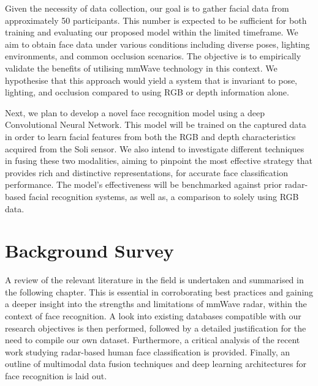 \documentclass{interim}
\begin{document}
Given the necessity of data collection, our goal is to gather facial data from approximately 50 participants. This number is expected to be sufficient for both training and evaluating our proposed model within the limited timeframe. We aim to obtain face data under various conditions including diverse poses, lighting environments, and common occlusion scenarios. The objective is to empirically validate the benefits of utilising mmWave technology in this context. We hypothesise that this approach would yield a system that is invariant to pose, lighting, and occlusion compared to using RGB or depth information alone.

Next, we plan to develop a novel face recognition model using a deep Convolutional Neural Network. This model will be trained on the captured data in order to learn facial features from both the RGB and depth characteristics acquired from the Soli sensor. We also intend to investigate different techniques in fusing these two modalities, aiming to pinpoint the most effective strategy that provides rich and distinctive representations, for accurate face classification performance. The model's effectiveness will be benchmarked against prior radar-based facial recognition systems, as well as, a comparison to solely using RGB data.




\section{Background Survey}
A review of the relevant literature in the field is undertaken and summarised in the following chapter. This is essential in corroborating best practices and gaining a deeper insight into the strengths and limitations of mmWave radar, within the context of face recognition. A look into existing databases compatible with our research objectives is then performed, followed by a detailed justification for the need to compile our own dataset. Furthermore, a critical analysis of the recent work studying radar-based human face classification is provided. Finally, an outline of multimodal data fusion techniques and deep learning architectures for face recognition is laid out.
\end{document}

